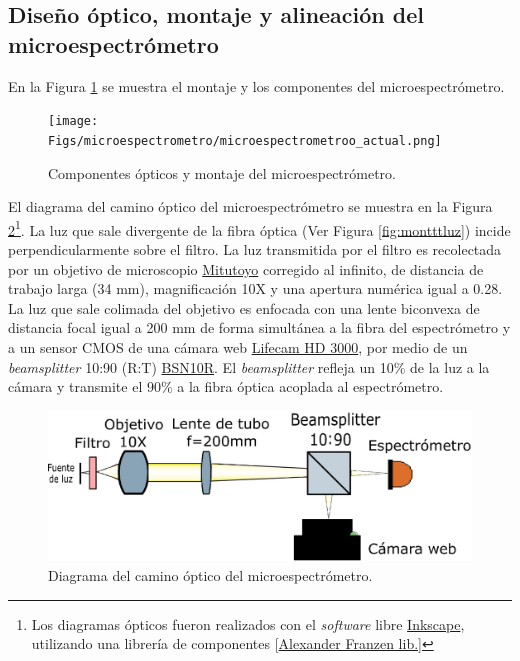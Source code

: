 
\singlespacing
\subsection{Diseño óptico, montaje y alineación del microespectrómetro}
\label{sec:montalin}

\hspace{0.5cm}En la Figura \ref{fig:micromfinal} se muestra el montaje y los componentes del microespectrómetro. 
\begin{figure}[H]
	\centering
	\texttt{[image: Figs/microespectrometro/microespectrometroo\_actual.png]}
	\caption{Componentes ópticos y montaje del microespectrómetro.}
	\label{fig:micromfinal}
\end{figure}
El diagrama del camino óptico del microespectrómetro se muestra en la Figura \ref{fig:diagcaminoopt}\footnote{Los diagramas ópticos fueron realizados con el \textit{software} libre \href{https://inkscape.org/es/}{Inkscape}, utilizando una librería de componentes [\href{http://www.gwoptics.org/ComponentLibrary/}{Alexander Franzen lib.]}}. La luz que sale divergente de la fibra óptica (Ver Figura \ref{fig:montttluz}) incide perpendicularmente sobre el filtro. La luz transmitida por el filtro es recolectada por un objetivo de microscopio \href{https://www.edmundoptics.com/p/10x-mitutoyo-plan-apo-infinity-corrected-long-wd-objective/6623/}{Mitutoyo} corregido al infinito, de distancia de trabajo larga (34 mm), magnificación 10X y una apertura numérica igual a 0.28. La luz que sale colimada del objetivo es enfocada con una lente biconvexa de distancia focal igual a 200 mm de forma simultánea a la fibra del espectrómetro y a un sensor CMOS de una cámara web \href{https://www.microsoft.com/accessories/es-xl/d/lifecam-hd-3000}{Lifecam HD 3000}, por medio de un \textit{beamsplitter} 10:90 (R:T) \href{https://www.thorlabs.com/thorproduct.cfm?partnumber=BSN10R}{BSN10R}. El \textit{beamsplitter} refleja un 10\% de la luz a la cámara y transmite el 90\% a la fibra óptica acoplada al espectrómetro. 
\begin{figure}[H]
	\centering
	\includegraphics[width=1.0\textwidth]{Figs/microespectrometro/diagopticosetup.png}
	\caption{Diagrama del camino óptico del microespectrómetro.}
	\label{fig:diagcaminoopt}
\end{figure}

